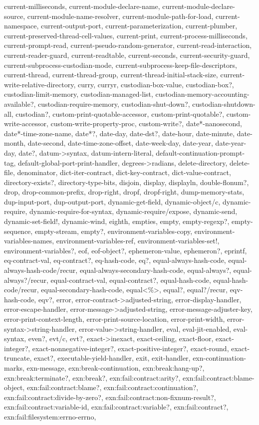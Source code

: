 {{current-milliseconds, current-module-declare-name, current-module-declare-source, current-module-name-resolver, current-module-path-for-load, current-namespace, current-output-port, current-parameterization, current-plumber, current-preserved-thread-cell-values, current-print, current-process-milliseconds, current-prompt-read, current-pseudo-random-generator, current-read-interaction, current-reader-guard, current-readtable, current-seconds, current-security-guard, current-subprocess-custodian-mode, current-subprocess-keep-file-descriptors, current-thread, current-thread-group, current-thread-initial-stack-size, current-write-relative-directory, curry, curryr, custodian-box-value, custodian-box?, custodian-limit-memory, custodian-managed-list, custodian-memory-accounting-available?, custodian-require-memory, custodian-shut-down?, custodian-shutdown-all, custodian?, custom-print-quotable-accessor, custom-print-quotable?, custom-write-accessor, custom-write-property-proc, custom-write?, date*-nanosecond, date*-time-zone-name, date*?, date-day, date-dst?, date-hour, date-minute, date-month, date-second, date-time-zone-offset, date-week-day, date-year, date-year-day, date?, datum->syntax, datum-intern-literal, default-continuation-prompt-tag, default-global-port-print-handler, degrees->radians, delete-directory, delete-file, denominator, dict-iter-contract, dict-key-contract, dict-value-contract, directory-exists?, directory-type-bits, disjoin, display, displayln, double-flonum?, drop, drop-common-prefix, drop-right, dropf, dropf-right, dump-memory-stats, dup-input-port, dup-output-port, dynamic-get-field, dynamic-object/c, dynamic-require, dynamic-require-for-syntax, dynamic-require/expose, dynamic-send, dynamic-set-field!, dynamic-wind, eighth, empties, empty, empty-regexp?, empty-sequence, empty-stream, empty?, environment-variables-copy, environment-variables-names, environment-variables-ref, environment-variables-set!, environment-variables?, eof, eof-object?, ephemeron-value, ephemeron?, eprintf, eq-contract-val, eq-contract?, eq-hash-code, eq?, equal-always-hash-code, equal-always-hash-code/recur, equal-always-secondary-hash-code, equal-always?, equal-always?/recur, equal-contract-val, equal-contract?, equal-hash-code, equal-hash-code/recur, equal-secondary-hash-code, equal<\%>, equal?, equal?/recur, eqv-hash-code, eqv?, error, error-contract->adjusted-string, error-display-handler, error-escape-handler, error-message->adjusted-string, error-message-adjuster-key, error-print-context-length, error-print-source-location, error-print-width, error-syntax->string-handler, error-value->string-handler, eval, eval-jit-enabled, eval-syntax, even?, evt/c, evt?, exact->inexact, exact-ceiling, exact-floor, exact-integer?, exact-nonnegative-integer?, exact-positive-integer?, exact-round, exact-truncate, exact?, executable-yield-handler, exit, exit-handler, exn-continuation-marks, exn-message, exn:break-continuation, exn:break:hang-up?, exn:break:terminate?, exn:break?, exn:fail:contract:arity?, exn:fail:contract:blame-object, exn:fail:contract:blame?, exn:fail:contract:continuation?, exn:fail:contract:divide-by-zero?, exn:fail:contract:non-fixnum-result?, exn:fail:contract:variable-id, exn:fail:contract:variable?, exn:fail:contract?, exn:fail:filesystem:errno-errno, }}
